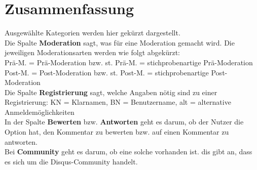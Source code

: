 \section{Zusammenfassung}
Ausgewählte Kategorien werden hier gekürzt 
dargestellt.\\
Die Spalte {\bf Moderation} sagt, was für eine Moderation gemacht wird.
Die jeweiligen Moderationsarten werden wie folgt abgekürzt:\\
Prä-M. = Prä-Moderation bzw. st. Prä-M. = stichprobenartige Prä-Moderation\\
Post-M. = Post-Moderation bzw. st. Post-M. = stichprobenartige Post-Moderation\\
Die Spalte {\bf Registrierung} sagt, welche Angaben nötig sind zu einer Registrierung: KN = Klarnamen, BN = Benutzername, alt = alternative Anmeldemöglichkeiten\\
In der Spalte {\bf Bewerten} bzw. {\bf Antworten} geht es darum, ob der Nutzer die Option hat, den Kommentar zu bewerten bzw. auf einen 
Kommentar zu antworten. \\
Bei {\bf Community} geht es darum, ob eine solche vorhanden ist. dis gibt an, dass es sich um die Disqus-Community handelt. 


